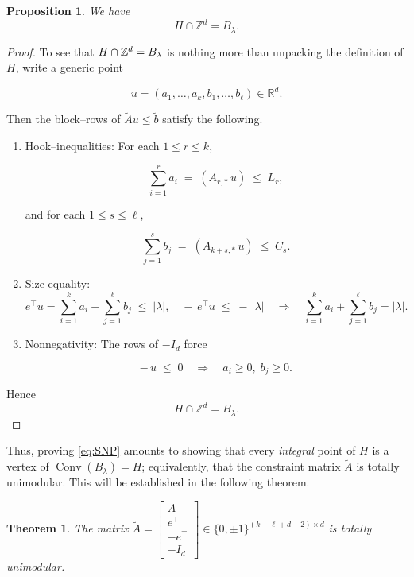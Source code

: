 \documentclass[12pt,a4paper,oneside]{amsart}
\newtheorem{theorem}{Theorem}[section]
\newtheorem{proposition}{Proposition}[section]
\theoremstyle{definition}
\DeclareMathOperator{\Conv}{Conv}
\newcommand{\Z}{\mathbb{Z}}
\newcommand{\R}{\mathbb{R}}
\begin{document}
\begin{proposition}
    We have
\[
   H\cap\Z^{d}=B_\lambda.
\]

\end{proposition}

\begin{proof}
To see that $H\cap\Bbb Z^d=B_\lambda$ is nothing more than unpacking the definition of $H$, write a generic point

$$
u=(a_1,\dots,a_k,b_1,\dots,b_\ell)\in\R^d.
$$

Then the block–rows of $\widetilde A u\le\widetilde b$ satisfy the following.
\begin{enumerate}
    \item Hook–inequalities:
   For each $1\le r\le k$,

   $$
     \sum_{i=1}^r a_i \;=\;(A_{r,*}\,u)\;\le\;L_r,
   $$

   and for each $1\le s\le\ell$,

   $$
     \sum_{j=1}^s b_j \;=\;(A_{k+s,*}\,u)\;\le\;C_s.
   $$

    \item Size equality: 
    $$
     e^\top u = \sum_{i=1}^k a_i + \sum_{j=1}^\ell b_j \;\le\;|\lambda|,
     \quad
     -\,e^\top u \;\le\;-\,|\lambda|
     \quad\Longrightarrow\quad
     \sum_{i=1}^k a_i + \sum_{j=1}^\ell b_j
     =|\lambda|.
   $$

    \item Nonnegativity: The rows of $-I_d$ force

   $$
     -\,u\;\le\;0
     \quad\Longrightarrow\quad
     a_i\ge0,\;b_j\ge0.
   $$

\end{enumerate}
    Hence
\[
   H\cap\Z^{d}=B_\lambda.
\]
\end{proof}

Thus, proving \eqref{eq:SNP} amounts to showing that every
\emph{integral} point of $H$ is a vertex of
$\Conv(B_\lambda)=H$; equivalently, that the constraint matrix
$\widetilde A$ is totally unimodular.  This will be established in the following theorem.


\begin{theorem}\label{thm:TU-tildeA}
The matrix $\widetilde A
          =\begin{bmatrix} A\\ e^{\!\top}\\ -e^{\!\top}\\ -I_{d}\end{bmatrix}
      \in\{0,\pm1\}^{(k+\ell+d+2)\times d}$
is totally unimodular.
\end{theorem}
\end{document}
